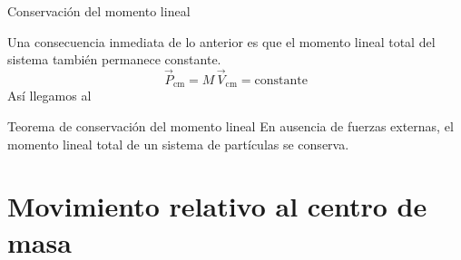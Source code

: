 \documentclass[11pt,handout,aspectratio=1610]{beamer}
\begin{document}
\begin{frame}{Conservación del momento lineal}

    Una consecuencia inmediata de lo anterior es que el momento lineal total del sistema también permanece constante. \pause $$\vec{P}_\text{cm} = M \, \vec{V}_\text{cm} = \text{constante}$$ \pause Así llegamos al
    \begin{block}{Teorema de conservación del momento lineal}
        En ausencia de fuerzas externas, el momento lineal total de un sistema de partículas se conserva.
    \end{block}

\end{frame}

\section{Movimiento relativo al centro de masa}
\end{document}
